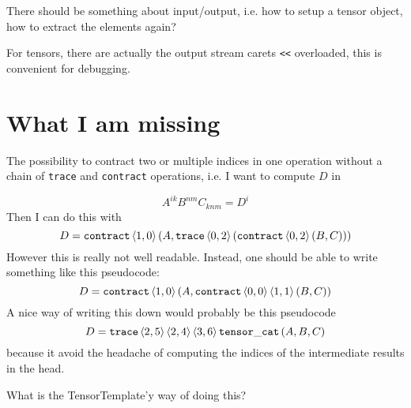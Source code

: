 \documentclass[a4paper]{article}
\begin{document}
There should be something about input/output,
i.e. how to setup a tensor object, how to extract
the elements again?

For tensors, there are actually the output stream
carets \verb|<<| overloaded, this is convenient for
debugging.

\section{What I am missing}

The possibility to contract two or multiple
indices in one operation without a chain
of \texttt{trace} and \texttt{contract}
operations, i.e. I want to compute $D$ in

\begin{equation*}
A^{ik} B^{nm} C_{knm}
= D^i
\end{equation*}
%
Then I can do this with
%
\begin{equation*}
D=
\mathtt{contract}\braket{1,0}\left(A,
\mathtt{trace}\braket{0,2}\left(
\mathtt{contract}\braket{0,2}\left(
B,C
\right)\right)\right)
\end{equation*}
%
However this is really not well readable.
Instead, one should be able to write something
like this pseudocode:
\begin{equation*}
D = 
\mathtt{contract}\braket{1,0}\left(A,
\mathtt{contract}\braket{0,0}\braket{1,1}(B,C)
\right)
\end{equation*}
A nice way of writing this down would probably
be this pseudocode
\begin{equation*}
D=
\mathtt{trace}\braket{2,5}\braket{2,4}\braket{3,6}
\mathtt{tensor\_cat}\left(A,B,C\right)
\end{equation*}
because it avoid the headache of computing the
indices of the intermediate results in the head.

What is the TensorTemplate'y way of doing this?
\end{document}
